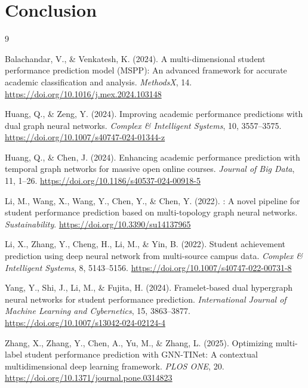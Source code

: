 \documentclass[sigconf]{acmart}
\begin{document}
\section{Conclusion}
\label{sec:conclusion}
\lipsum[1]



\begin{thebibliography}{9}

Balachandar, V., \& Venkatesh, K. (2024).
\newblock A multi-dimensional student performance prediction model ({MSPP}):
  An advanced framework for accurate academic classification and analysis.
\newblock \emph{MethodsX}, 14.
\newblock \url{https://doi.org/10.1016/j.mex.2024.103148}

Huang, Q., \& Zeng, Y. (2024).
\newblock Improving academic performance predictions with dual graph neural
  networks.
\newblock \emph{Complex \& Intelligent Systems}, 10, 3557--3575.
\newblock \url{https://doi.org/10.1007/s40747-024-01344-z}

Huang, Q., \& Chen, J. (2024).
\newblock Enhancing academic performance prediction with temporal graph
  networks for massive open online courses.
\newblock \emph{Journal of Big Data}, 11, 1--26.
\newblock \url{https://doi.org/10.1186/s40537-024-00918-5}

Li, M., Wang, X., Wang, Y., Chen, Y., \& Chen, Y. (2022).
: A novel pipeline for student performance prediction
  based on multi-topology graph neural networks.
\newblock \emph{Sustainability}.
\newblock \url{https://doi.org/10.3390/su14137965}

Li, X., Zhang, Y., Cheng, H., Li, M., \& Yin, B. (2022).
\newblock Student achievement prediction using deep neural network from
  multi-source campus data.
\newblock \emph{Complex \& Intelligent Systems}, 8, 5143--5156.
\newblock \url{https://doi.org/10.1007/s40747-022-00731-8}

Yang, Y., Shi, J., Li, M., \& Fujita, H. (2024).
\newblock Framelet-based dual hypergraph neural networks for student
  performance prediction.
\newblock \emph{International Journal of Machine Learning and Cybernetics},
  15, 3863--3877.
\newblock \url{https://doi.org/10.1007/s13042-024-02124-4}

Zhang, X., Zhang, Y., Chen, A., Yu, M., \& Zhang, L. (2025).
\newblock Optimizing multi-label student performance prediction with
  {GNN-TINet}: A contextual multidimensional deep learning framework.
\newblock \emph{PLOS ONE}, 20.
\newblock \url{https://doi.org/10.1371/journal.pone.0314823}

\end{thebibliography}
\end{document}
